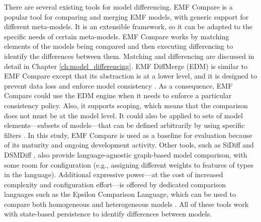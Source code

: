 There are several existing tools for model differencing. EMF Compare \cite{emfcompare2018developer} is a popular tool for comparing and merging EMF models, with generic support for different meta-models. It is an extensible framework, so it can be adapted to the specific needs of certain meta-models. EMF Compare works by matching elements of the models being compared and then executing differencing to identify the differences between them. Matching and differencing are discussed in detail in Chapter \ref{ch:model_differencing}. EMF DiffMerge (EDM) \cite{eclipse2019emfdiffmerge} is similar to EMF Compare except that its abstraction is at a lower level, and it is designed to prevent data loss and enforce model consistency \cite{eclipse2019emfdiffmerge2}. As a consequence, EMF Compare could use the EDM engine when it needs to enforce a particular consistency policy. Also, it supports scoping, which means that the comparison does not must be at the model level. It could also be applied to sets of model elements—subsets of models—that can be defined arbitrarily by using specific filters \cite{jaxenter2019emfdiffmerge}. In this study, EMF Compare is used as a baseline for evaluation because of its maturity and ongoing development activity. Other tools, such as SiDiff \cite{Treude2007SiDiff} and DSMDiff \cite{lin2009dsmdiff}, also provide language-agnostic graph-based model comparison, with some room for configuration (e.g., assigning different weights to features of types in the language). Additional expressive power—at the cost of increased complexity and configuration effort—is offered by dedicated comparison languages such as the Epsilon Comparison Language, which can be used to compare both homogeneous and heterogeneous models \cite{kolovos2009ecl}. All of these tools work with state-based persistence to identify differences between models.

